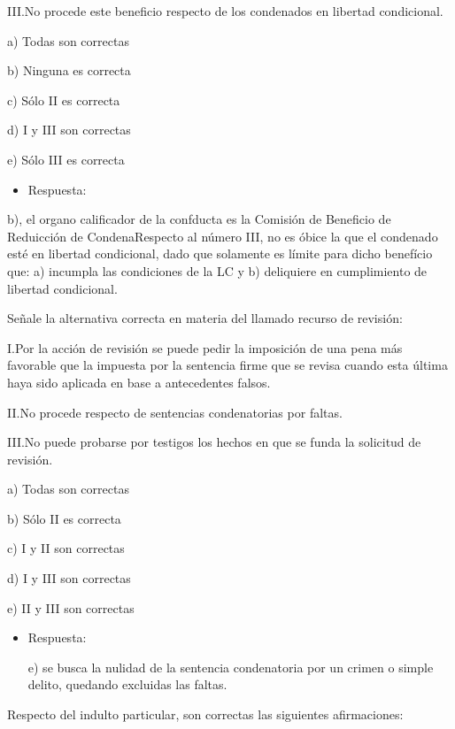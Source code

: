 \documentclass[letterpaper, 11pt]{article}
\begin{document}
III.No procede este beneficio respecto de los condenados en libertad
condicional.




a) Todas son correctas

b) Ninguna es correcta

c) Sólo II es correcta

d) I y III son correctas

e) Sólo III es correcta


\begin{itemize}
\item Respuesta:
\end{itemize}

b), el organo calificador de la confducta es la Comisión de Beneficio
  de Reduicción de CondenaRespecto al número III, no es óbice la que
  el condenado esté en libertad condicional, dado que solamente es
  límite para dicho benefício que: a) incumpla las condiciones de la
  LC y b) deliquiere en cumplimiento de libertad condicional.


Señale la alternativa correcta en materia del llamado recurso de
revisión:


I.Por la acción de revisión se puede pedir la imposición de una pena
más favorable que la impuesta por la sentencia firme que se revisa
cuando esta última haya sido aplicada en base a antecedentes falsos.



II.No procede respecto de sentencias condenatorias por faltas.



III.No puede probarse por testigos los hechos en que se funda la
solicitud de revisión.


a) Todas son correctas

b) Sólo II es correcta

c) I y II son correctas

d) I y III son correctas

e) II y III son correctas


\begin{itemize}
\item Respuesta:

e) se busca la nulidad de la sentencia condenatoria por un crimen o
simple delito, quedando excluidas las faltas.
\end{itemize}



Respecto del indulto particular, son correctas las siguientes
afirmaciones:
\end{document}
